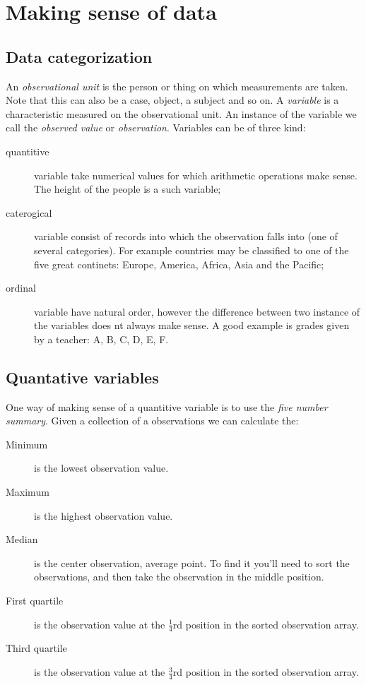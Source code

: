 \section{Making sense of data}

\subsection{Data categorization}

An \emph{observational unit} is the person or thing on which measurements are
taken. Note that this can also be a case, object, a subject and so on. A
\emph{variable} is a characteristic measured on the observational unit. An
instance of the variable we call the \emph{observed value} or
\emph{observation}. Variables can be of three kind:

\begin{description}
  \item[quantitive] variable take numerical values for which arithmetic
  operations make sense. The height of the people is a such variable;
  \item[caterogical] variable consist of records into which the observation
  falls into (one of several categories). For example countries may be
  classified to one of the five great continets: Europe, America, Africa, Asia
  and the Pacific;
  \item[ordinal] variable have natural order, however the difference between two
  instance of the variables does nt always make sense. A good example is grades
  given by a teacher: A, B, C, D, E, F.
   
\end{description}

\subsection{Quantative variables}

One way of making sense of a quantitive variable is to use the \emph{five
number summary}. Given a collection of a observations we can calculate the: 

\begin{description}
  \item[Minimum] is the lowest observation value.
  \item[Maximum] is the highest observation value.
  \item[Median] is the center observation, average point. To find it you'll need
  to sort the observations, and then take the observation in the middle
  position.
  \item[First quartile] is the observation value at the $\frac{1}{4}$rd position
  in the sorted observation array.
  \item[Third quartile] is the observation value at the $\frac{3}{4}$rd position
  in the sorted observation array.
\end{description}

